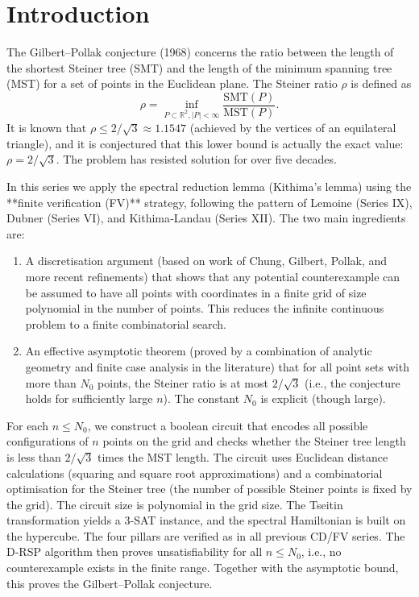 \documentclass[11pt,a4paper]{article}
\begin{document}
\tableofcontents

\section{Introduction}

The Gilbert–Pollak conjecture (1968) concerns the ratio between the length of the shortest Steiner tree (SMT) and the length of the minimum spanning tree (MST) for a set of points in the Euclidean plane. The Steiner ratio \(\rho\) is defined as
\[
\rho = \inf_{P \subset \mathbb{R}^2, |P|<\infty} \frac{\text{SMT}(P)}{\text{MST}(P)}.
\]
It is known that \(\rho \le 2/\sqrt{3} \approx 1.1547\) (achieved by the vertices of an equilateral triangle), and it is conjectured that this lower bound is actually the exact value: \(\rho = 2/\sqrt{3}\). The problem has resisted solution for over five decades.

In this series we apply the spectral reduction lemma (Kithima's lemma) using the **finite verification (FV)** strategy, following the pattern of Lemoine (Series IX), Dubner (Series VI), and Kithima‑Landau (Series XII). The two main ingredients are:
\begin{enumerate}
\item A discretisation argument (based on work of Chung, Gilbert, Pollak, and more recent refinements) that shows that any potential counterexample can be assumed to have all points with coordinates in a finite grid of size polynomial in the number of points. This reduces the infinite continuous problem to a finite combinatorial search.
\item An effective asymptotic theorem (proved by a combination of analytic geometry and finite case analysis in the literature) that for all point sets with more than \(N_0\) points, the Steiner ratio is at most \(2/\sqrt{3}\) (i.e., the conjecture holds for sufficiently large \(n\)). The constant \(N_0\) is explicit (though large).
\end{enumerate}
For each \(n \le N_0\), we construct a boolean circuit that encodes all possible configurations of \(n\) points on the grid and checks whether the Steiner tree length is less than \(2/\sqrt{3}\) times the MST length. The circuit uses Euclidean distance calculations (squaring and square root approximations) and a combinatorial optimisation for the Steiner tree (the number of possible Steiner points is fixed by the grid). The circuit size is polynomial in the grid size. The Tseitin transformation yields a 3‑SAT instance, and the spectral Hamiltonian is built on the hypercube. The four pillars are verified as in all previous CD/FV series. The D‑RSP algorithm then proves unsatisfiability for all \(n \le N_0\), i.e., no counterexample exists in the finite range. Together with the asymptotic bound, this proves the Gilbert–Pollak conjecture.
\end{document}
